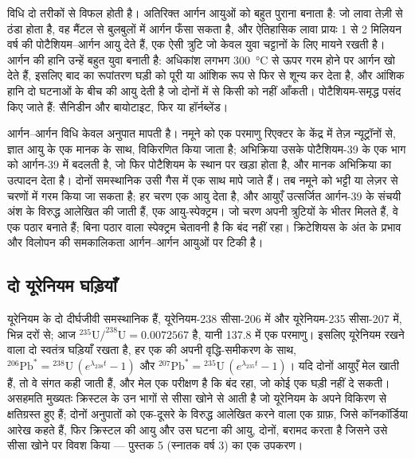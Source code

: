 विधि दो तरीकों से विफल होती है। अतिरिक्त आर्गन आयुओं को बहुत पुराना बनाता है: जो लावा तेज़ी से ठंडा होता है, वह मैंटल से बुलबुलों में आर्गन फँसा सकता है, और ऐतिहासिक लावा प्रायः 1 से 2 मिलियन वर्ष की पोटैशियम–आर्गन आयु देते हैं, एक ऐसी त्रुटि जो केवल युवा चट्टानों के लिए मायने रखती है। आर्गन की हानि उन्हें बहुत युवा बनाती है: अधिकांश  लगभग \qty{300}{\celsius} से ऊपर गरम होने पर आर्गन खो देते हैं, इसलिए बाद का रूपांतरण घड़ी को पूरी या आंशिक रूप से फिर से शून्य कर देता है, और आंशिक हानि दो घटनाओं के बीच की आयु देती है जो दोनों में से किसी को नहीं आँकती। पोटैशियम-समृद्ध  पसंद किए जाते हैं: सैनिडीन और बायोटाइट, फिर  या हॉर्नब्लेंड।

आर्गन–आर्गन विधि केवल अनुपात मापती है। नमूने को एक परमाणु रिएक्टर के केंद्र में तेज़ न्यूट्रॉनों से, ज्ञात आयु के एक मानक  के साथ, विकिरणित किया जाता है; अभिक्रिया उसके पोटैशियम-39 के एक भाग को आर्गन-39 में बदलती है, जो फिर पोटैशियम के स्थान पर खड़ा होता है, और मानक अभिक्रिया का उत्पादन देता है। दोनों समस्थानिक उसी गैस में एक साथ मापे जाते हैं। तब नमूने को भट्टी या लेज़र से चरणों में गरम किया जा सकता है; हर चरण एक आयु देता है, और आयुएँ उत्सर्जित आर्गन-39 के संचयी अंश के विरुद्ध आलेखित की जाती हैं, एक आयु-स्पेक्ट्रम। जो चरण अपनी त्रुटियों के भीतर मिलते हैं, वे एक पठार बनाते हैं; बिना पठार वाला स्पेक्ट्रम चेतावनी है कि  बंद नहीं रहा। क्रिटेशियस के अंत के प्रभाव और विलोपन की समकालिकता आर्गन–आर्गन आयुओं पर टिकी है।

\subsection*{दो यूरेनियम घड़ियाँ}

यूरेनियम के दो दीर्घजीवी समस्थानिक हैं, यूरेनियम-238 सीसा-206 में और यूरेनियम-235 सीसा-207 में, भिन्न दरों से; आज $^{235}\mathrm{U}/^{238}\mathrm{U} = 0.0072567$ है, यानी 137.8 में एक परमाणु। इसलिए यूरेनियम रखने वाला  दो स्वतंत्र घड़ियाँ रखता है, हर एक की अपनी वृद्धि-समीकरण के साथ, ${}^{206}\mathrm{Pb}^* = {}^{238}\mathrm{U}\,(e^{\lambda_{238} t} - 1)$ और ${}^{207}\mathrm{Pb}^* = {}^{235}\mathrm{U}\,(e^{\lambda_{235} t} - 1)$। यदि दोनों आयुएँ मेल खाती हैं, तो वे संगत कही जाती हैं, और मेल एक परीक्षण है कि  बंद रहा, जो कोई एक घड़ी नहीं दे सकती। असहमति मुख्यतः क्रिस्टल के उन भागों से सीसा खोने से आती है जो यूरेनियम के अपने विकिरण से क्षतिग्रस्त हुए हैं; दोनों अनुपातों को एक-दूसरे के विरुद्ध आलेखित करने वाला एक ग्राफ़, जिसे कॉनकॉर्डिया आरेख कहते हैं, फिर क्रिस्टल की आयु और उस घटना की आयु, दोनों, बरामद करता है जिसने उसे सीसा खोने पर विवश किया --- पुस्तक 5 (स्नातक वर्ष 3) का एक उपकरण।

